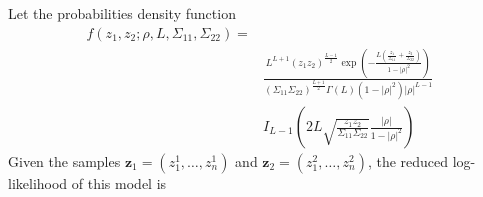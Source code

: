 \documentclass[journal]{IEEEtran}
\begin{document}
Let the probabilities density function 
\begin{equation}\label{fun_pdf_biv_inten}
\begin{split}
	f(z_1,z_2;\rho,L, \Sigma_{11}, \Sigma_{22}) =\\
	&\frac{L^{L+1}\left(z_1z_2\right)^{\frac{L-1}{2}}\exp\left(-\frac{L\left(\frac{z_1}{\Sigma_{11}}+\frac{z_2}{\Sigma_{22}}\right)}{1-|\rho|^2}\right)}{(\Sigma_{11}\Sigma_{22})^{\frac{L+1}{2}}\Gamma(L)(1-|\rho|^2)|\rho|^{L-1}}\\
	&I_{L-1}\left(2L\sqrt{\frac{z_1z_2}{\Sigma_{11}\Sigma_{22}}}\frac{|\rho|}{1-|\rho|^2}\right)
\end{split}
\end{equation}
Given the samples $\bm z_1 = (z_1^1,\dots,z_n^1)$ and $\bm z_2 = (z_1^2,\dots,z_n^2)$, the reduced log-likelihood of this model is
\end{document}

